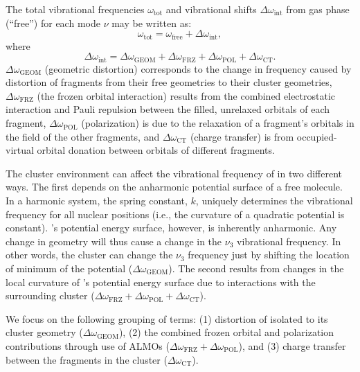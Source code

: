 \documentclass[%
  class = book,%
  crop = false,%
  float = true,%
  multi = true,%
  preview = false,%
]{standalone}
\begin{document}
{The total vibrational frequencies \(\omega_{\mathrm{tot}}\) and vibrational shifts \(\Delta \omega_\mathrm{int}\) from gas phase (``free'')  for each mode \(\nu\) may be written as:
\begin{equation}
  \omega_\mathrm{tot} = \omega_\mathrm{free} + \Delta \omega_\mathrm{int},
\end{equation}
where
\begin{equation}
  \Delta \omega_\mathrm{int} = \Delta \omega_\mathrm{GEOM} + \Delta \omega_\mathrm{FRZ} + \Delta \omega_\mathrm{POL} + \Delta \omega_\mathrm{CT}.
\end{equation}
\(\Delta \omega_\mathrm{GEOM}\) (geometric distortion) corresponds to the change in frequency caused by distortion of fragments from their free geometries to their cluster geometries, \(\Delta \omega_\mathrm{FRZ}\) (the frozen orbital interaction) results from the combined electrostatic interaction and Pauli repulsion between the filled, unrelaxed orbitals of each fragment, \(\Delta \omega_\mathrm{POL}\) (polarization) is due to the relaxation of a fragment's orbitals in the field of the other fragments, and \(\Delta \omega_\mathrm{CT}\) (charge transfer) is from occupied-virtual orbital donation between orbitals of different fragments.\cite{Ramos-Cordoba2011}

The cluster environment can affect the vibrational frequency of  in two different ways. The first depends on the anharmonic potential surface of a free  molecule. In a harmonic system, the spring constant, \(k\), uniquely determines the vibrational frequency for all nuclear positions (i.e., the curvature of a quadratic potential is constant). 's potential energy surface, however, is inherently anharmonic. Any change in geometry will thus cause a change in the \(\nu_3\) vibrational frequency. In other words, the cluster can change the \(\nu_3\) frequency just by shifting the location of minimum of the  potential (\(\Delta \omega_\mathrm{GEOM}\)). The second results from changes in the local curvature of 's potential energy surface due to interactions with the surrounding cluster (\(\Delta \omega_\mathrm{FRZ} + \Delta\omega_\mathrm{POL} + \Delta \omega_\mathrm{CT}\)).

We focus on the following grouping of terms: (1) distortion of isolated  to its cluster geometry (\(\Delta \omega_\mathrm{GEOM}\)), (2) the combined frozen orbital and polarization contributions through use of ALMOs (\(\Delta \omega_\mathrm{FRZ} + \Delta \omega_\mathrm{POL}\)), and (3) charge transfer between the fragments in the cluster (\(\Delta \omega_\mathrm{CT}\)).

}
\end{document}
